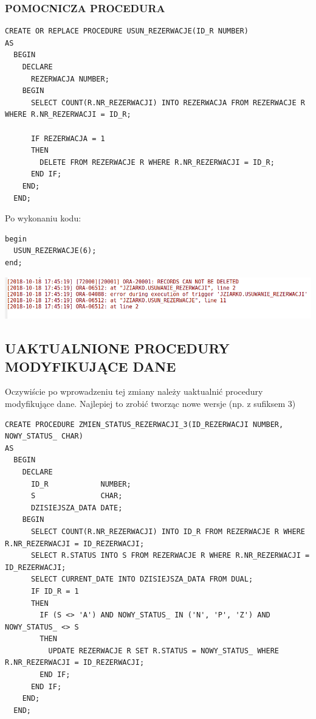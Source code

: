 \subsubsection{POMOCNICZA PROCEDURA}
\begin{verbatim}
CREATE OR REPLACE PROCEDURE USUN_REZERWACJE(ID_R NUMBER)
AS
  BEGIN
    DECLARE
      REZERWACJA NUMBER;
    BEGIN
      SELECT COUNT(R.NR_REZERWACJI) INTO REZERWACJA FROM REZERWACJE R WHERE R.NR_REZERWACJI = ID_R;

      IF REZERWACJA = 1
      THEN
        DELETE FROM REZERWACJE R WHERE R.NR_REZERWACJI = ID_R;
      END IF;
    END;
  END;
\end{verbatim}

Po wykonaniu kodu:
\begin{verbatim}
begin
  USUN_REZERWACJE(6);
end;
\end{verbatim}
\includegraphics[width=\linewidth]{./images/records_can_not_be_deleted.png}

\subsection{UAKTUALNIONE PROCEDURY MODYFIKUJĄCE DANE}
Oczywiście po wprowadzeniu tej zmiany należy uaktualnić procedury modyfikujące dane.
Najlepiej to zrobić tworząc nowe wersje (np. z sufiksem 3)

\begin{verbatim}
CREATE PROCEDURE ZMIEN_STATUS_REZERWACJI_3(ID_REZERWACJI NUMBER, NOWY_STATUS_ CHAR)
AS
  BEGIN
    DECLARE
      ID_R            NUMBER;
      S               CHAR;
      DZISIEJSZA_DATA DATE;
    BEGIN
      SELECT COUNT(R.NR_REZERWACJI) INTO ID_R FROM REZERWACJE R WHERE R.NR_REZERWACJI = ID_REZERWACJI;
      SELECT R.STATUS INTO S FROM REZERWACJE R WHERE R.NR_REZERWACJI = ID_REZERWACJI;
      SELECT CURRENT_DATE INTO DZISIEJSZA_DATA FROM DUAL;
      IF ID_R = 1
      THEN
        IF (S <> 'A') AND NOWY_STATUS_ IN ('N', 'P', 'Z') AND NOWY_STATUS_ <> S
        THEN
          UPDATE REZERWACJE R SET R.STATUS = NOWY_STATUS_ WHERE R.NR_REZERWACJI = ID_REZERWACJI;
        END IF;
      END IF;
    END;
  END;
\end{verbatim}
 